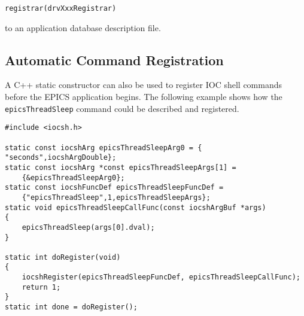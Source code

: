 \begin{verbatim}registrar(drvXxxRegistrar)
\end{verbatim}to an application database description file.

\subsection{Automatic Command Registration}

A C++ static constructor can also be used to register IOC shell commands before the EPICS application begins. The 
following example shows how the \verb|epicsThreadSleep| command could be described and registered.

\begin{verbatim}#include <iocsh.h>

static const iocshArg epicsThreadSleepArg0 = { "seconds",iocshArgDouble};
static const iocshArg *const epicsThreadSleepArgs[1] =
    {&epicsThreadSleepArg0};
static const iocshFuncDef epicsThreadSleepFuncDef =
    {"epicsThreadSleep",1,epicsThreadSleepArgs};
static void epicsThreadSleepCallFunc(const iocshArgBuf *args)
{
    epicsThreadSleep(args[0].dval);
}

static int doRegister(void)
{
    iocshRegister(epicsThreadSleepFuncDef, epicsThreadSleepCallFunc);
    return 1;
}
static int done = doRegister();
\end{verbatim}


